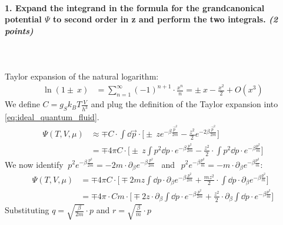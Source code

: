 \paragraph{1. Expand the integrand in the formula for the 
    grandcanonical potential $\Psi$ to second order in z 
    and perform the two integrals. \textit{(2 points)}
} \ \\
    \\
    Taylor expansion of the natural logarithm:
    \begin{align}
        \ln(1\pm\ x)
        &=\sum_{n=1}^\infty(-1)^{n+1}\cdot\frac{x^n}{n}
        =\pm\ x-\frac{x^2}{2}+O(x^3) 
    \end{align}
    We define $C=g_Sk_BT\frac{V}{h^3}$ and plug the 
    definition of the Taylor expansion into 
    \autoref{eq:ideal_quantum_fluid}.
    \begin{align}
        \Psi(T,V,\mu)
        &\approx\mp C\cdot
        \int\dd\vec p\cdot\bigg[
            \pm\ ze^{-\beta\frac{\vec p^2}{2m}}
            -\frac{z^2}{2}e^{-2\beta\frac{\vec p^2}{2m}}
        \bigg] \\
        &=\mp 4\pi C\cdot\bigg[
            \pm\ z\int p^2\dd p\cdot
                e^{-\beta\frac{p^2}{2m}}
            -\frac{z^2}{2}\cdot\int p^2\dd p\cdot
                e^{-\beta\frac{p^2}{m}}
        \bigg]
    \end{align}
    We now identify $\ p^2e^{-\beta\frac{p^2}{2m}}
    =-2m\cdot\partial_\beta e^{-\beta\frac{p^2}{2m}}\ \ $
    and $\ \ p^2e^{-\beta\frac{p^2}{m}}
    =-m\cdot\partial_\beta e^{-\beta\frac{p^2}{m}}$:
    \begin{align}
        \Psi(T,V,\mu)
        &=\mp 4\pi C\cdot\bigg[
            \mp2mz\int \dd p\cdot\partial_\beta
                e^{-\beta\frac{p^2}{2m}}
            +\frac{mz^2}{2}\cdot\int \dd p\cdot\partial_\beta
                e^{-\beta\frac{p^2}{m}}
        \bigg] \\
        &=\mp 4\pi\cdot Cm\cdot\bigg[
            \mp2z\cdot\partial_\beta\int \dd p\cdot
                e^{-\beta\frac{p^2}{2m}}
            +\frac{z^2}{2}\cdot\partial_\beta\int \dd p\cdot
                e^{-\beta\frac{p^2}{m}}
        \bigg]
    \end{align}
    Substituting $q=\sqrt{\frac{\beta}{2m}}\cdot p$
    and $r=\sqrt{\frac{\beta}{m}}\cdot p$
